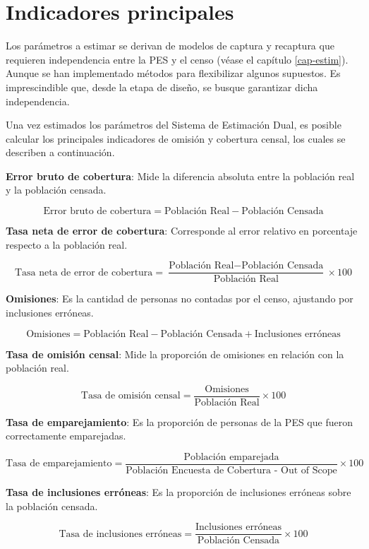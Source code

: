 \documentclass[
  12pt,
]{book}
\begin{document}
\section{Indicadores principales}\label{indicadores-principales}

Los parámetros a estimar se derivan de modelos de captura y recaptura que requieren independencia entre la PES y el censo (véase el capítulo \ref{cap-estim}). Aunque se han implementado métodos para flexibilizar algunos supuestos. Es imprescindible que, desde la etapa de diseño, se busque garantizar dicha independencia.

Una vez estimados los parámetros del Sistema de Estimación Dual, es posible calcular los principales indicadores de omisión y cobertura censal, los cuales se describen a continuación.

\textbf{Error bruto de cobertura}: Mide la diferencia absoluta entre la población real y la población censada.

\[
\text{Error bruto de cobertura} = \text{Población Real} - \text{Población Censada}
\]

\textbf{Tasa neta de error de cobertura}: Corresponde al error relativo en porcentaje respecto a la población real.

\[
\text{Tasa neta de error de cobertura} = \frac{\text{Población Real} - \text{Población Censada}}{\text{Población Real}} \times 100
\]

\textbf{Omisiones}: Es la cantidad de personas no contadas por el censo, ajustando por inclusiones erróneas.

\[
\text{Omisiones} = \text{Población Real} - \text{Población Censada} + \text{Inclusiones erróneas}
\]

\textbf{Tasa de omisión censal}: Mide la proporción de omisiones en relación con la población real.

\[
\text{Tasa de omisión censal} = \frac{\text{Omisiones}}{\text{Población Real}} \times 100
\]

\textbf{Tasa de emparejamiento}: Es la proporción de personas de la PES que fueron correctamente emparejadas.

\[
\text{Tasa de emparejamiento} = \frac{\text{Población emparejada}}{\text{Población Encuesta de Cobertura - Out of Scope}} \times 100
\]

\textbf{Tasa de inclusiones erróneas}: Es la proporción de inclusiones erróneas sobre la población censada.

\[
\text{Tasa de inclusiones erróneas} = \frac{\text{Inclusiones erróneas}}{\text{Población Censada}} \times 100
\]
\end{document}
